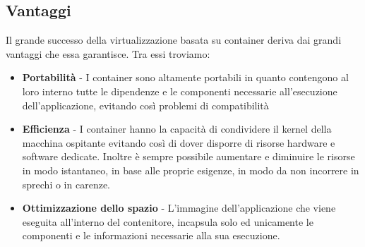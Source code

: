 \subsection{Vantaggi}
Il grande successo della virtualizzazione basata su container deriva dai grandi vantaggi che essa garantisce. Tra essi troviamo:
\begin{itemize}
\item \textbf{Portabilità} - I container sono altamente portabili in quanto contengono al loro interno tutte le dipendenze e le componenti necessarie all'esecuzione dell'applicazione, evitando così problemi di compatibilità
\item \textbf{Efficienza} - I container hanno la capacità di condividere il kernel della macchina ospitante evitando così di dover disporre di risorse hardware e software dedicate. Inoltre è sempre possibile aumentare e diminuire le risorse in modo istantaneo, in base alle proprie esigenze, in modo da non incorrere in sprechi o in carenze.
\item \textbf{Ottimizzazione dello spazio} - L'immagine dell'applicazione che viene eseguita all'interno del contenitore, incapsula solo ed unicamente le componenti e le informazioni necessarie alla sua esecuzione.
\end{itemize}